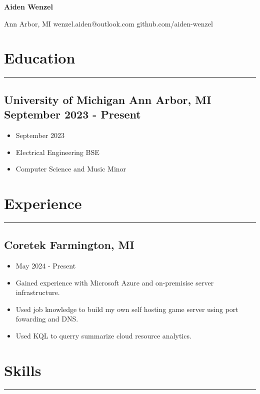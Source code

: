 \documentclass[10pt, letterpaper]{article}
\begin{document}
\thispagestyle{empty}
\begin{center}
	\textbf{\huge{Aiden Wenzel}}
	\vspace{3pt}

	Ann Arbor, MI wenzel.aiden@outlook.com github.com/aiden-wenzel
\end{center}

\section*{Education}
\hrule
\vspace{7pt}

\subsection*{University of Michigan  Ann Arbor, MI  September 2023 - Present}
\begin{itemize}[noitemsep]
	\item September 2023
	\item Electrical Engineering BSE
	\item Computer Science and Music Minor
\end{itemize}

\section*{Experience}
\hrule
\vspace{7pt}

\subsection*{Coretek Farmington, MI}
\begin{itemize}[noitemsep]
	\item May 2024 - Present
	\item Gained experience with Microsoft Azure and on-premisise server infrastructure.
	\item Used job knowledge to build my own self hosting game server using port fowarding and DNS.
	\item Used KQL to querry summarize cloud resource analytics.
\end{itemize}

\section*{Skills}
\hrule
\vspace{7pt}
\end{document}
